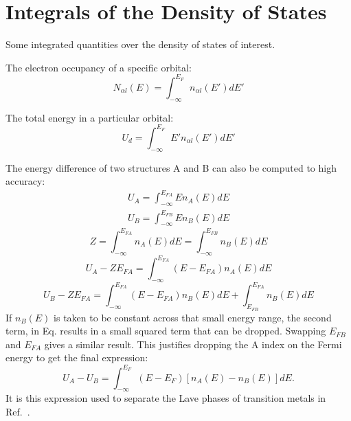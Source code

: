 \documentclass{article}
\def\ket{\rangle}
\begin{document}

\section{Integrals of the Density of States}
%
Some integrated quantities over the density of states of interest.

The electron occupancy of a specific orbital:
%
\begin{equation}
N_{\alpha l}(E) = \int_{-\infty}^{E_{F}} n_{\alpha l}(E') dE'
\end{equation}
%

The total energy in a particular orbital:
%
\begin{equation}
U_{d} = \int_{-\infty}^{E_{F}}E'n_{\alpha l}(E') dE'
\end{equation}
%

The energy difference of two structures A and B can also be computed
to high accuracy:
%
\begin{eqnarray}
\label{eq:Ua}
U_{A} = \int_{-\infty}^{E_{FA}} E n_{A}(E) dE
\end{eqnarray}
%
\begin{eqnarray}
\label{eq:Ub}
U_{B} = \int_{-\infty}^{E_{FB}} E n_{B}(E) dE
\end{eqnarray}
%
\begin{equation}
\label{eq:totaldos}
Z = \int_{-\infty}^{E_{FA}} n_{A}(E)dE = \int_{-\infty}^{E_{FB}}n_{B}(E)dE
\end{equation}
%
\begin{equation}
U_{A}-ZE_{FA}= \int_{-\infty}^{E_{FA}}(E-E_{FA})n_{A}(E)dE
\end{equation}
%
\begin{equation}
U_{B}-ZE_{FA}= \int_{-\infty}^{E_{FA}}(E-E_{FA})n_{B}(E)dE + \int_{E_{FB}}^{E_{FA}}n_{B}(E)dE
\end{equation}
%
If $n_{B}(E)$ is taken to be constant across that small energy range, the second term, in
Eq. results in a small squared term that can be dropped. Swapping $E_{FB}$ and $E_{FA}$ gives
a similar result. This justifies dropping the A index on the Fermi energy to get the
final expression:
%
\begin{equation}
U_{A}-U_{B} = \int_{-\infty}^{E_{F}}(E-E_{F})[n_{A}(E) -n_{B}(E)]dE.
\end{equation}
%
It is this expression used to separate the Lave phases of transition metals in Ref.~\cite{haydock76}.
\end{document}
